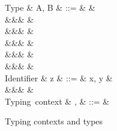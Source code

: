 \begin{figure}[H]
\begin{syntaxfig}
\mbox{Type}
&
A, B
&
::=
&
\tyBool
&
\\
&&&
\tyInt
&
\\
&&&
&
\\
&&&
&
\\
&&&
&
\\
&&&
&
\\[2mm]
\mbox{Identifier}
&
z
&
::=
&
x, y
&
\\
&&&
\primOp
&
\\[2mm]
\mbox{Typing context}
&
\Gamma, \Delta
&
::=
&
\end{syntaxfig}
\caption{Typing contexts and types}
\end{figure}
